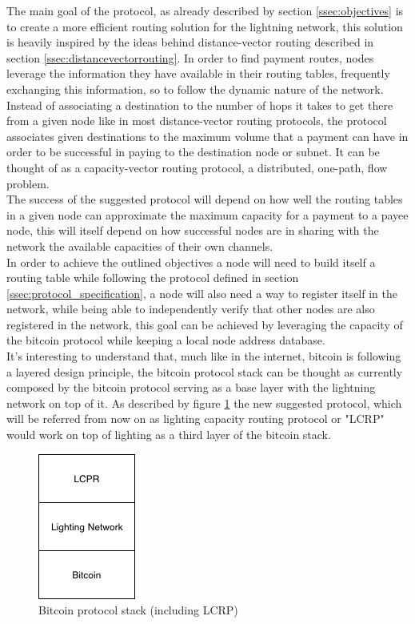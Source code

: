 The main goal of the protocol, as already described by section \ref{ssec:objectives} is to create a more efficient routing solution for the lightning network, this solution is heavily inspired by the ideas behind distance-vector routing described in section \ref{ssec:distancevectorrouting}. In order to find  payment routes, nodes leverage the information they have available in their routing tables, frequently exchanging this information, so to follow the dynamic nature of the network. Instead of associating a destination to the number of hops it takes to get there from a given node like in most distance-vector routing protocols, the protocol associates given destinations to the maximum volume that a payment can have in order to be successful in paying to the destination node or subnet. It can be thought of as a capacity-vector routing protocol, a distributed, one-path, flow problem. \\
The success of the suggested protocol will depend on how well the routing tables in a given node can approximate the maximum capacity for a payment to a payee node, this will itself depend on how successful nodes are in sharing with the network the available capacities of their own channels. \\
In order to achieve the outlined objectives a node will need to build itself a routing table while following the protocol defined in section \ref{ssec:protocol_specification}, a node will also need a way to register itself in the network, while being able to independently verify that other nodes are also registered in the network, this goal can be achieved by leveraging the capacity of the bitcoin protocol while keeping a local node address database. \\
It's interesting to understand that, much like in the internet, bitcoin is following a layered design principle, the bitcoin protocol stack can be thought as currently composed by the bitcoin protocol serving as a base layer with the lightning network on top of it. As described by figure \ref{fig:bitcoin_protocol_stack} the new suggested protocol, which will be referred from now on as lighting capacity routing protocol or "LCRP" would work on top of lighting as a third layer of the bitcoin stack.

\begin{figure}[H]
\begin{center}
  \includegraphics[width=0.2\linewidth]{images/bitcoin_protocol_stack.png}
  \caption{Bitcoin protocol stack (including LCRP)}
  \label{fig:bitcoin_protocol_stack}
  \end{center}
\end{figure}

